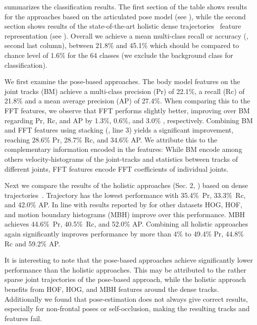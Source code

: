  summarizes the classification results. The first section of the table shows results for the approaches based on the articulated pose model (see ), while the second section shows results of the state-of-the-art holistic dense trajectories~\citep{wang11cvpr} feature representation (see ).
%
Overall we achieve a mean multi-class recall or accuracy (, second last column), between 21.8\% and 45.1\% which should be 
compared to chance level of 1.6\% for the 64 classes (we exclude the background class for classification).

We first examine the pose-based approaches. The body model features on the joint tracks (BM)  achieve a multi-class precision (Pr) of 22.1\%, a recall (Rc) of 21.8\% and a mean average precision (AP) of 27.4\%. When comparing this to the FFT features, we observe that FFT performs slightly better, improving over BM regarding Pr, Rc, and AP by 1.3\%, 0.6\%, and 3.0\%%
, respectively.  Combining BM and FFT features using stacking (, line 3) yields a significant improvement, reaching 28.6\% Pr, 28.7\% Rc, and 34.6\% AP. We attribute this to the complementary information encoded in the features: While BM encode among others velocity-histograms of the joint-tracks and statistics between tracks of different joints, FFT features encode FFT coefficients of individual joints. 
 
Next we compare the results of the holistic approaches (Sec. 2, )  based on  dense trajectories~\citep{wang11cvpr}. Trajectory has the lowest performance with 35.4\%~Pr, 33.3\%~Rc, and 42.0\% AP. In line with results reported by \citet{wang11cvpr} for other datasets HOG, HOF, and motion boundary histograms (MBH) improve over this performance.  MBH achieves 44.6\%~Pr, 40.5\%~Rc, and 52.0\% AP. 
Combining all holistic approaches again significantly improves performance by more than 4\% to 49.4\% Pr, 44.8\% Rc and 59.2\% AP. 

It is interesting to note that the pose-based approaches achieve significantly lower performance than the holistic approaches. 
%
This may be attributed to the rather sparse joint trajectories of the pose-based approach, while the holistic approach benefits from HOF, HOG, and MBH features around the dense tracks. Additionally we found that pose-estimation does not always give correct results, 
especially for non-frontal poses or self-occlusion, making the resulting tracks and features fail.

